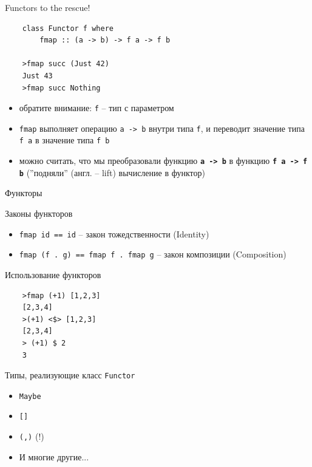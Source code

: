 \documentclass{beamer}
\begin{document}
  \begin{frame}[fragile]{Functors to the rescue!}
      \begin{verbatim}
    class Functor f where
        fmap :: (a -> b) -> f a -> f b
        
    >fmap succ (Just 42)
    Just 43
    >fmap succ Nothing
      \end{verbatim}
      \begin{itemize}
          \item \alert{обратите внимание}: \texttt{f} -- тип с параметром
          \item \texttt{fmap} выполняет операцию \texttt{a -> b} внутри типа \texttt{f}, и переводит значение типа \texttt{f a} в значение типа \texttt{f b}
          \item можно считать, что мы преобразовали функцию \texttt{\textbf{a -> b}} в функцию \texttt{\textbf{f a -> f b}} (''подняли'' (англ. -- lift) вычисление в функтор)
      \end{itemize}
  \end{frame}
  \begin{frame}[fragile]{Функторы}
    \begin{block}{Законы функторов}
      \begin{itemize}
          \item \texttt{fmap id == id} -- закон тожедственности (Identity)
          \item \texttt{fmap (f . g) == fmap f . fmap g} -- закон композиции (Composition)
      \end{itemize}
      \end{block}
      \begin{block}{Использование функторов}
        \begin{verbatim}
    >fmap (+1) [1,2,3]
    [2,3,4]
    >(+1) <$> [1,2,3]
    [2,3,4]
    > (+1) $ 2
    3
        \end{verbatim}
      \end{block}
  \end{frame}
  \begin{frame}{Типы, реализующие класс \texttt{Functor}}
      \begin{itemize}
          \item \texttt{Maybe}
          \item \texttt{[]}
          \item \texttt{(,)} \alert{(!)}
          \item И многие другие...
      \end{itemize}
  \end{frame}
\end{document}

